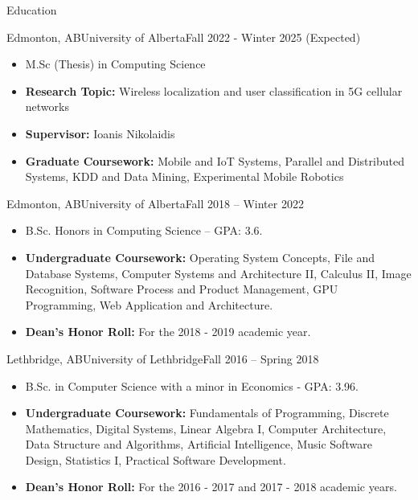 \documentclass[]{mcdowellcv}
\begin{document}
\makeheader

\begin{cvsection}{Education}
  \begin{cvsubsection}{Edmonton, AB}{University of Alberta}{Fall 2022 - Winter 2025 (Expected)}
    \begin{itemize}
      \item M.Sc (Thesis) in Computing Science
      \item \textbf{Research Topic:} Wireless localization and user classification in 5G cellular networks
      \item \textbf{Supervisor:} Ioanis Nikolaidis 
      \item \textbf{Graduate Coursework:} Mobile and IoT Systems, Parallel and Distributed Systems, KDD and Data Mining, Experimental Mobile Robotics
    \end{itemize}
  \end{cvsubsection}
  \begin{cvsubsection}{Edmonton, AB}{University of Alberta}{Fall 2018 -- Winter 2022}
    \begin{itemize}
      \item B.Sc. Honors in Computing Science -- GPA: 3.6.
      \item \textbf{Undergraduate Coursework:} Operating System Concepts, File and Database Systems,
        Computer Systems and Architecture II, Calculus II, Image Recognition, Software Process and Product Management, GPU Programming,
        Web Application and Architecture.
      \item \textbf{Dean's Honor Roll:} For the 2018 - 2019 academic year. 
    \end{itemize}
  \end{cvsubsection}

  \begin{cvsubsection}{Lethbridge, AB}{University of Lethbridge}{Fall 2016 -- Spring 2018}
    \begin{itemize}   
      \item B.Sc. in Computer Science with a minor in Economics - GPA: 3.96.
      \item \textbf{Undergraduate Coursework:} Fundamentals of Programming, Discrete Mathematics, 
        Digital Systems, Linear Algebra I, Computer Architecture, Data Structure and Algorithms, 
        Artificial Intelligence, Music Software Design, Statistics I, Practical Software Development.
      \item \textbf{Dean's Honor Roll:} For the 2016 - 2017 and 2017 - 2018 academic years.
    \end{itemize}
  \end{cvsubsection}
\end{cvsection}
\end{document}
